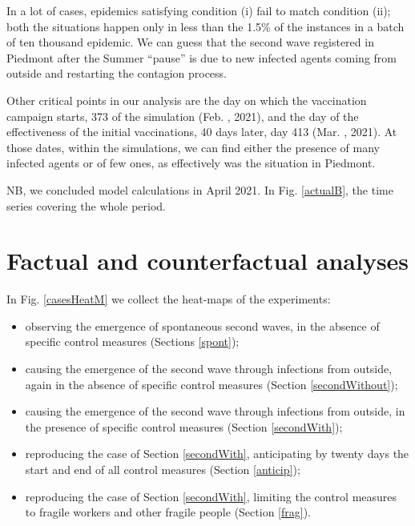 \documentclass[graybox]{svmult}
\begin{document}
In a lot of cases, epidemics satisfying condition (i) fail to match condition (ii); both the situations happen only in less than the 1.5\% of the instances in a batch of ten thousand epidemic. We can guess that the second wave registered in Piedmont after the Summer ``pause'' is due to new infected agents coming from outside and restarting the contagion process.

Other critical points in our analysis are the day on which the vaccination campaign starts, 373 of the simulation (Feb. , 2021), and the day of the effectiveness of the initial vaccinations, 40 days later, day 413 (Mar. , 2021). At those dates, within the simulations, we can find either the presence of many infected agents or of few ones, as effectively was the situation in Piedmont.

NB, we concluded model calculations in April 2021. In Fig. \ref{actualB}, the time series covering the whole period.



\section{Factual and counterfactual analyses}
\label{facCounterfac}

In Fig. \ref{casesHeatM} we collect the heat-maps of the experiments:

\begin{itemize}

\item observing the emergence of spontaneous second waves, in the absence of specific control measures (Sections \ref{spont});

\item causing the emergence of the second wave through infections from outside, again in the absence of specific control measures (Section \ref{secondWithout});

\item causing the emergence of the second wave through infections from outside, in the presence of specific control measures (Section \ref{secondWith});

\item reproducing the case of Section \ref{secondWith}, anticipating by twenty days the start and end of all control measures (Section \ref{anticip});

\item reproducing the case of Section \ref{secondWith}, limiting the control measures to fragile workers and other fragile people (Section \ref{frag}).

\end{itemize}
\end{document}
